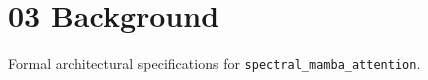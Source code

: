 \section{03 Background}

Formal architectural specifications for \texttt{spectral_mamba_attention}.
